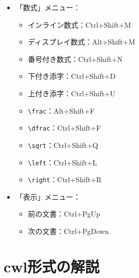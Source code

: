 \begin{itemize}
  \begin{itemize}
  \item
    箇条書きの項目(\verb+\item+)：Ctrl+Shift+I
  \item
    イタリック体：Ctrl+I
  \item
    スラント体：Ctrl+Shift+S
  \item
    ボールド体：Ctrl+B
  \item
    タイプライター体：Ctrl+Shift+T
  \item
    スモールキャップス体：Ctrl+Shift+C
  \item
    強調：Ctrl+Shift+E
  \item
    強制改行：Ctrl+Return
  \item
    \verb+begin{environment}+：Ctrl+E
  \item
    次のラベルに参照(\verb+\ref+)を挿入：Ctrl+Alt+R
  \end{itemize}
\item
  「数式」メニュー：

  \begin{itemize}
  \item
    インライン数式：Ctrl+Shift+M
  \item
    ディスプレイ数式：Alt+Shift+M
  \item
    番号付き数式：Ctrl+Shift+N
  \item
    下付き添字：Ctrl+Shift+D
  \item
    上付き添字：Ctrl+Shift+U
  \item
    \verb+\frac+：Alt+Shift+F
  \item
    \verb+\dfrac+：Ctrl+Shift+F
  \item
    \verb+\sqrt+：Ctrl+Shift+Q
  \item
    \verb+\left+：Ctrl+Shift+L
  \item
    \verb+\right+：Ctrl+Shift+R
  \end{itemize}
\item
  「表示」メニュー：

  \begin{itemize}
  \item
    前の文書：Ctrl+PgUp
  \item
    次の文書：Ctrl+PgDown
  \end{itemize}
\end{itemize}

\section{cwl形式の解説}\label{sec:desc_of_clw}

